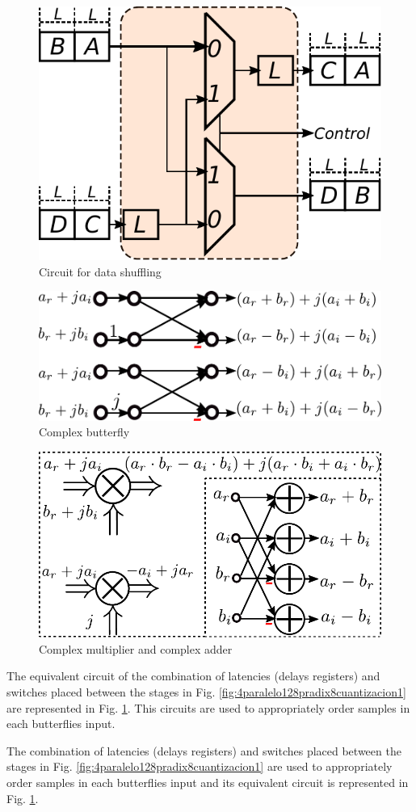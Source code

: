\documentclass[10pt,times,mathptm,psfig,final,journal,comsoc]{IEEEtran}
\begin{document}
\begin{figure}[ht!] 
	\centering
	\includegraphics[width=0.3\linewidth]{Diagramas/miSeccionFiguras/Shift.pdf}
	\caption{Circuit for data shuffling}
	\label{fig:shift}
\end{figure}
\begin{figure}[ht!] 
	\centering
	\includegraphics[width=0.6\linewidth]{Diagramas/miSeccionFiguras/ButterComplejo.pdf}
	\caption{Complex butterfly }
	\label{fig:buttercomplejo}
\end{figure}
\begin{figure}[ht!] 
	\centering
	\includegraphics[width=0.65\linewidth]{Diagramas/miSeccionFiguras/SumMult.pdf}
	\caption{Complex multiplier and complex adder}
	\label{fig:summult}
\end{figure}

The equivalent circuit of the combination of latencies (delays registers) and switches placed between the stages in Fig. \ref{fig:4paralelo128pradix8cuantizacion1} are represented in Fig. \ref{fig:shift}. This circuits are used to appropriately order samples in each butterflies input.

The combination of latencies (delays registers) and switches placed between the stages in Fig. \ref{fig:4paralelo128pradix8cuantizacion1} are used to appropriately order samples in each butterflies input and its equivalent circuit is represented in Fig. \ref{fig:shift}.
\end{document}

